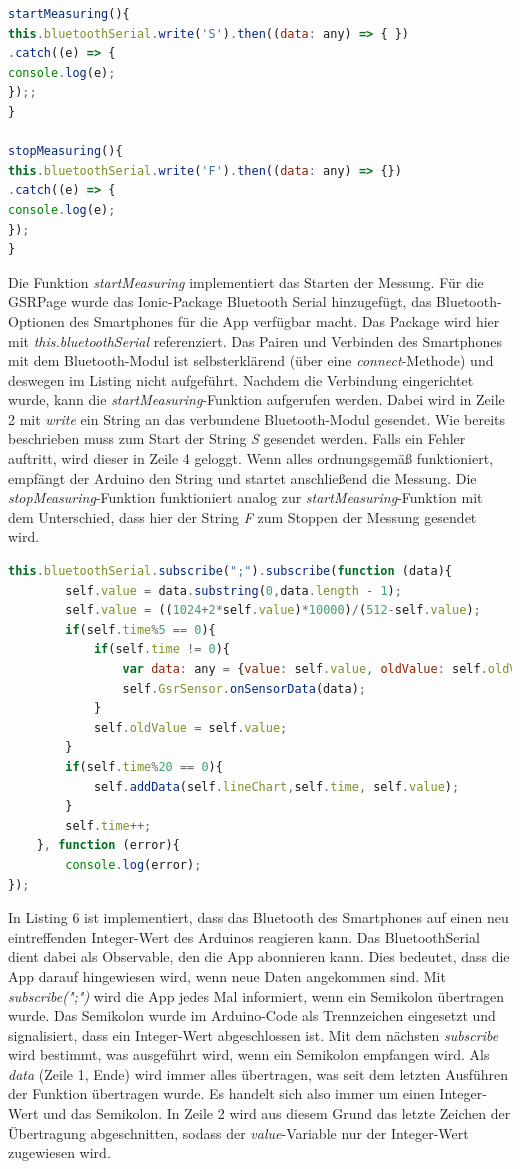 \begin{lstlisting}[caption={JS Code}, language=JavaScript]
startMeasuring(){
this.bluetoothSerial.write('S').then((data: any) => { })
.catch((e) => {
console.log(e);
});;
}

stopMeasuring(){
this.bluetoothSerial.write('F').then((data: any) => {})
.catch((e) => {
console.log(e);
});
}
\end{lstlisting}
Die Funktion \textit{startMeasuring} implementiert das Starten der Messung. Für die GSRPage wurde das Ionic-Package Bluetooth Serial hinzugefügt, das Bluetooth-Optionen des Smartphones für die App verfügbar macht. Das Package wird hier mit \textit{this.bluetoothSerial} referenziert. Das Pairen und Verbinden des Smartphones mit dem Bluetooth-Modul ist selbsterklärend (über eine \textit{connect}-Methode) und deswegen im Listing nicht aufgeführt. Nachdem die Verbindung eingerichtet wurde, kann die \textit{startMeasuring}-Funktion aufgerufen werden. Dabei wird in Zeile 2 mit \textit{write} ein String an das verbundene Bluetooth-Modul gesendet. Wie bereits beschrieben muss zum Start der String \textit{S} gesendet werden. Falls ein Fehler auftritt, wird dieser in Zeile 4 geloggt. Wenn alles ordnungsgemäß funktioniert, empfängt der Arduino den String und startet anschließend die Messung.\newline
Die \textit{stopMeasuring}-Funktion funktioniert analog zur \textit{startMeasuring}-Funktion mit dem Unterschied, dass hier der String \textit{F} zum Stoppen der Messung gesendet wird.
\newline
\begin{lstlisting}[caption={JS Code}, language=JavaScript]
this.bluetoothSerial.subscribe(";").subscribe(function (data){
		self.value = data.substring(0,data.length - 1);
		self.value = ((1024+2*self.value)*10000)/(512-self.value);
		if(self.time%5 == 0){
			if(self.time != 0){
				var data: any = {value: self.value, oldValue: self.oldValue};
				self.GsrSensor.onSensorData(data);
			}
			self.oldValue = self.value;
		} 
		if(self.time%20 == 0){
			self.addData(self.lineChart,self.time, self.value); 
		}
		self.time++;
	}, function (error){
		console.log(error);
});
\end{lstlisting}
In Listing 6 ist implementiert, dass das Bluetooth des Smartphones auf einen neu eintreffenden Integer-Wert des Arduinos reagieren kann. Das BluetoothSerial dient dabei als Observable, den die App abonnieren kann. Dies bedeutet, dass die App darauf hingewiesen wird, wenn neue Daten angekommen sind. Mit \textit{subscribe(";")} wird die App jedes Mal informiert, wenn ein Semikolon übertragen wurde. Das Semikolon wurde im Arduino-Code als Trennzeichen eingesetzt und signalisiert, dass ein Integer-Wert abgeschlossen ist. Mit dem nächsten \textit{subscribe} wird bestimmt, was ausgeführt wird, wenn ein Semikolon empfangen wird. Als \textit{data} (Zeile 1, Ende) wird immer alles übertragen, was seit dem letzten Ausführen der Funktion übertragen wurde. Es handelt sich also immer um einen Integer-Wert und das Semikolon. In Zeile 2 wird aus diesem Grund das letzte Zeichen der Übertragung abgeschnitten, sodass der \textit{value}-Variable nur der Integer-Wert zugewiesen wird.
